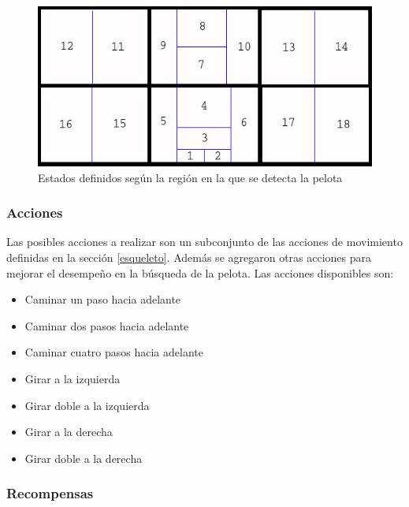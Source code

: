 \begin{figure}[hbtp]
\centering
\includegraphics[scale=0.5]{imagenes/Regiones2.jpg}
\caption{Estados definidos seg\'un la región en la que se detecta la pelota}
\label{fig:estados2}
\end{figure}


\subsubsection{Acciones}\label{sec:acciones}

Las posibles acciones a realizar son un subconjunto de las acciones de movimiento definidas en la sección \ref{esqueleto}. Además se agregaron otras acciones para mejorar el desempeño en la búsqueda de la pelota. Las acciones disponibles son:

\begin{itemize}
\item {Caminar un paso hacia adelante }
\item {Caminar dos pasos hacia adelante }
\item {Caminar cuatro pasos hacia adelante}
\item {Girar a la izquierda}
\item {Girar doble a la izquierda} 
\item {Girar a la derecha }
\item {Girar doble a la derecha}
\label{item:todaslasacciones}
\end{itemize}
\subsubsection{Recompensas}\label{recompensas}

